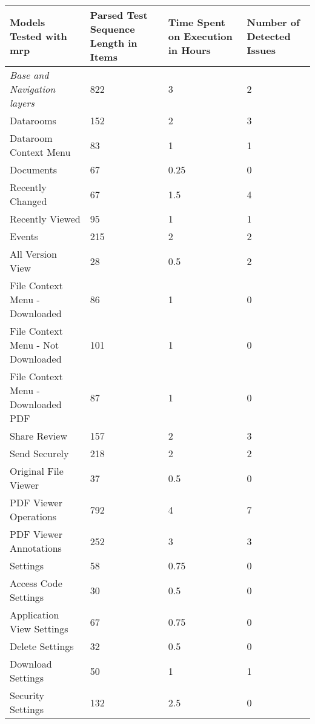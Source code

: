 \begin{table}[]
    \centering
    \begin{tabular}{|l|p{2cm}|p{2cm}|p{2cm}|}
        \hline
        \textbf{Models Tested with \acrshort{mrp}} & \textbf{Parsed Test Sequence Length in Items} & \textbf{Time Spent on Execution in Hours} & \textbf{Number of Detected Issues}\\
        \hline
        \textit{Base and Navigation layers} & 822 & 3 & 2 \\
        \hline
        Datarooms & 152 & 2 & 3 \\
        \hline
        Dataroom Context Menu & 83 & 1 & 1 \\
        \hline
        Documents & 67 & 0.25 & 0 \\
        \hline
        Recently Changed & 67 & 1.5 & 4 \\
        \hline
        Recently Viewed & 95 & 1 & 1 \\
        \hline
        Events & 215 & 2 & 2 \\
        \hline
        All Version View & 28 & 0.5 & 2 \\
        \hline
        File Context Menu - Downloaded & 86 & 1 & 0 \\
        \hline
        File Context Menu - Not Downloaded & 101 & 1 & 0 \\
        \hline
        File Context Menu - Downloaded PDF & 87 & 1 & 0 \\
        \hline
        Share Review & 157 & 2 & 3 \\
        \hline
        Send Securely & 218 & 2 & 2 \\
        \hline
        Original File Viewer & 37 & 0.5 & 0 \\
        \hline
        PDF Viewer Operations & 792 & 4 & 7 \\
        \hline
        PDF Viewer Annotations & 252 & 3 & 3 \\
        \hline
        Settings & 58 & 0.75 & 0 \\
        \hline
        Access Code Settings & 30 & 0.5 & 0 \\
        \hline
        Application View Settings & 67 & 0.75 & 0 \\
        \hline
        Delete Settings & 32 & 0.5 & 0 \\
        \hline
        Download Settings & 50 & 1 & 1 \\
        \hline
        Security Settings & 132 & 2.5 & 0 \\
        \hline

\end{tabular}
\end{table}
